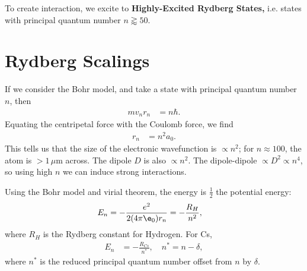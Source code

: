 \documentclass[lasers.tex]{subfiles}
\begin{document}
To create interaction, we excite to \textbf{Highly-Excited Rydberg States,} i.e. states with principal quantum number $n\gtrapprox50$.

\section{Rydberg Scalings}
If we consider the Bohr model, and take a state with principal quantum number $n$, then 
\begin{align}
    mv_nr_n &= n\hbar.
\end{align}
Equating the centripetal force with the Coulomb force, we find
\begin{align}
    r_n &= n^2a_0.
\end{align}
This tells us that the size of the electronic wavefunction is $\propto n^2$; for $n\approx100$, the atom is $> 1\,\mu$m across.
The dipole $D$ is also $\propto n^2$.
The dipole-dipole $\propto D^2\propto n^4$, so using high $n$ we can induce strong interactions. 

Using the Bohr model and virial theorem, the energy is $\frac12$ the potential energy:
\begin{align}
    E_n &= -\frac{e^2}{2(4\pi\e_0)r_n} = -\frac{R_H}{n^2},
\end{align}
where $R_H$ is the Rydberg constant for Hydrogen. 
For Cs, 
\begin{align}
    E_n &= - \frac{R_{Cs}}{n^*},\quad n^* = n - \delta,
\end{align}
where $n^*$ is the reduced principal quantum number offset from $n$ by $\delta$.
\end{document}
